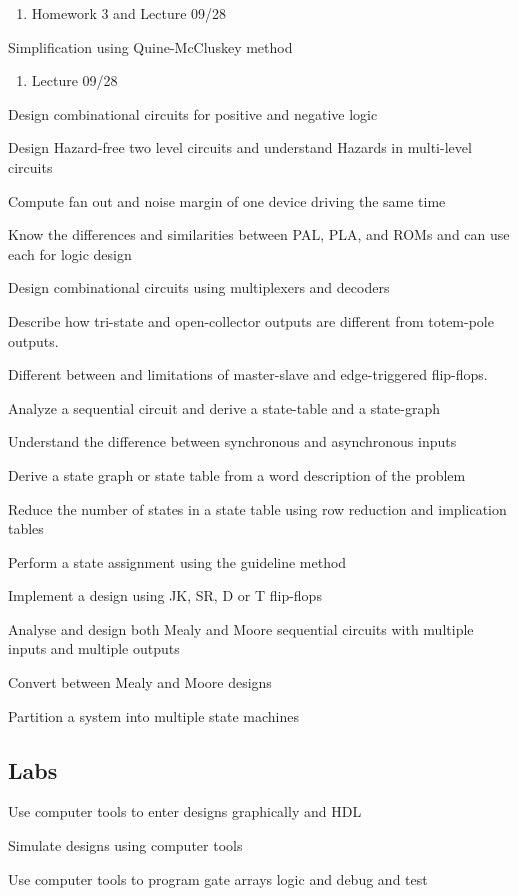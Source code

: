 \begin{todolist}
    \begin{enumerate}
      \item Homework 3 and Lecture 09/28 
    \end{enumerate}
  \item[\done]  Simplification using Quine-McCluskey method
    \begin{enumerate}
    \item Lecture 09/28 
    \end{enumerate}
  \item  Design combinational circuits for positive and negative logic
  \item  Design Hazard-free two level circuits and understand Hazards in multi-level circuits
  \item  Compute fan out and noise margin of one device driving the same time
  \item  Know the differences and similarities between PAL, PLA, and ROMs and can use each for logic design
  \item Design combinational circuits using multiplexers and decoders
  \item Describe how tri-state and open-collector outputs are different from totem-pole outputs.
  \item Different between and limitations of master-slave and edge-triggered flip-flops.
  \item Analyze a sequential circuit and derive a state-table and a state-graph
  \item Understand the difference between synchronous and asynchronous inputs
  \item Derive a state graph or state table from a word description of the problem
  \item Reduce the number of states in a state table using row reduction and implication tables
  \item Perform a state assignment using the guideline method
  \item Implement a design using JK, SR, D or T flip-flops
  \item Analyse and design both Mealy and Moore sequential circuits with multiple inputs and multiple outputs
  \item Convert between Mealy and Moore designs
  \item Partition a system into multiple state machines
\end{todolist}

\subsection{Labs}
\begin{todolist}
  \item[\done] Use computer tools to enter designs graphically and HDL
  \item Simulate designs using computer tools
  \item Use computer tools to program gate arrays logic and debug and test
\end{todolist}

\newpage
